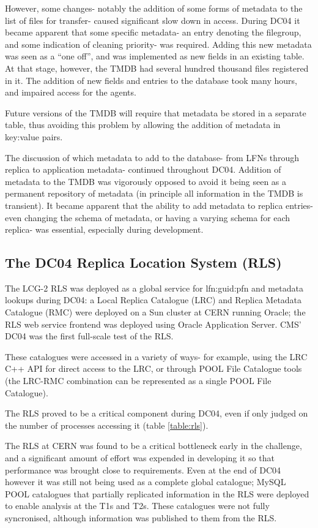 \documentclass{cmspaper}
\begin{document}
However, some changes- notably the addition of some forms of metadata
to the list of files for transfer- caused significant slow down in
access. During DC04 it became apparent that some specific metadata- an
entry denoting the filegroup, and some indication of cleaning
priority- was required. Adding this new metadata was seen as a ``one
off'', and was implemented as new fields in an existing table. At that
stage, however, the TMDB had several hundred thousand files registered
in it. The addition of new fields and entries to the database took
many hours, and impaired access for the agents.

Future versions of the TMDB will require that metadata be stored in a
separate table, thus avoiding this problem by allowing the addition of
metadata in key:value pairs.

The discussion of which metadata to add to the database- from LFNs
through replica to application metadata- continued throughout
DC04. Addition of metadata to the TMDB was vigorously opposed to avoid
it being seen as a permanent repository of metadata (in principle all
information in the TMDB is transient). It became apparent that the
ability to add metadata to replica entries- even changing the schema
of metadata, or having a varying schema for each replica- was
essential, especially during development.

\subsection{The DC04 Replica Location System (RLS)}
The LCG-2 RLS was deployed as a global service for lfn:guid:pfn and
metadata lookups during DC04: a Local Replica Catalogue (LRC) and
Replica Metadata Catalogue (RMC) were deployed on a Sun cluster at
CERN running Oracle; the RLS web service frontend was deployed using
Oracle Application Server. CMS' DC04 was the first full-scale test of
the RLS.

These catalogues were accessed in a variety of ways- for example,
using the LRC C++ API for direct access to the LRC, or through POOL
File Catalogue tools (the LRC-RMC combination can be represented as a
single POOL File Catalogue).

The RLS proved to be a critical component during DC04, even if only
judged on the number of processes accessing it (table
\ref{table:rls}).

The RLS at CERN was found to be a critical bottleneck early in the
challenge, and a significant amount of effort was expended in
developing it so that performance was brought close to
requirements. Even at the end of DC04 however it was still not being
used as a complete global catalogue; MySQL POOL catalogues that
partially replicated information in the RLS were deployed to enable
analysis at the T1s and T2s. These catalogues were not fully
syncronised, although information was published to them from the RLS.
\end{document}
